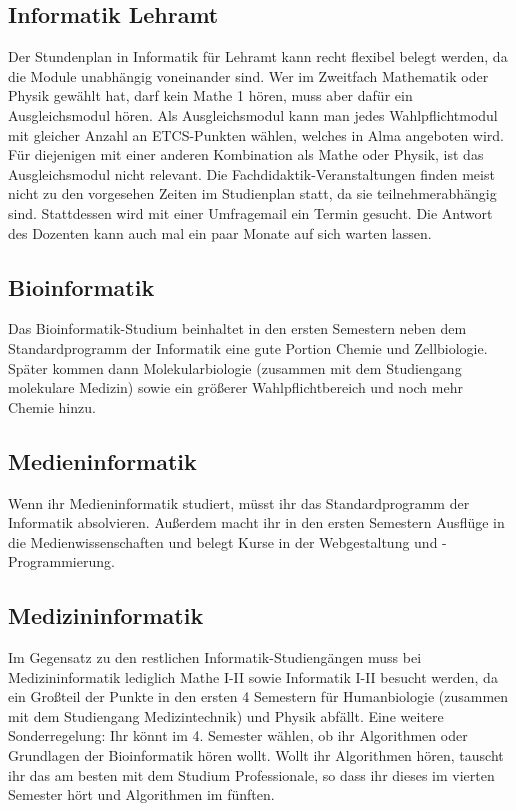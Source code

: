 \subsection*{Informatik Lehramt}
	
Der Stundenplan in Informatik für Lehramt kann recht flexibel belegt werden, da
die Module unabhängig voneinander sind. Wer im Zweitfach Mathematik oder Physik
gewählt hat, darf kein Mathe 1 hören, muss aber dafür ein Ausgleichsmodul
hören. Als Ausgleichsmodul kann man jedes Wahlpflichtmodul mit gleicher Anzahl
an ETCS-Punkten wählen, welches in Alma angeboten wird. Für diejenigen mit
einer anderen Kombination als Mathe oder Physik, ist das Ausgleichsmodul nicht
relevant. Die Fachdidaktik-Veranstaltungen finden meist nicht zu den vorgesehen
Zeiten im Studienplan statt, da sie teilnehmerabhängig sind. Stattdessen wird
mit einer Umfragemail ein Termin gesucht. Die Antwort des Dozenten kann auch
mal ein paar Monate auf sich warten lassen.

\subsection*{Bioinformatik}
	
Das Bioinformatik-Studium beinhaltet in den ersten Semestern neben dem
Standardprogramm der Informatik eine gute Portion Chemie und Zellbiologie.
Später kommen dann Molekularbiologie (zusammen mit dem Studiengang molekulare
Medizin) sowie ein größerer Wahlpflichtbereich und noch mehr Chemie hinzu.

\subsection*{Medieninformatik}
	
Wenn ihr Medieninformatik studiert, müsst ihr das Standardprogramm der
Informatik absolvieren. Außerdem macht ihr in den ersten Semestern Ausflüge in
die Medienwissenschaften und belegt Kurse in der Webgestaltung und
-Programmierung.

\pagebreak 
\subsection*{Medizininformatik}
	
Im Gegensatz zu den restlichen Informatik-Studiengängen muss bei
Medizininformatik lediglich Mathe I-II sowie Informatik I-II besucht werden, da
ein Großteil der Punkte in den ersten 4 Semestern für Humanbiologie (zusammen
mit dem Studiengang Medizintechnik) und Physik abfällt. Eine weitere
Sonderregelung: Ihr könnt im 4. Semester wählen, ob ihr Algorithmen oder
Grundlagen der Bioinformatik hören wollt. Wollt ihr Algorithmen hören, tauscht
ihr das am besten mit dem Studium Professionale, so dass ihr dieses im vierten
Semester hört und Algorithmen im fünften.

\vfill
{}
\pagebreak
